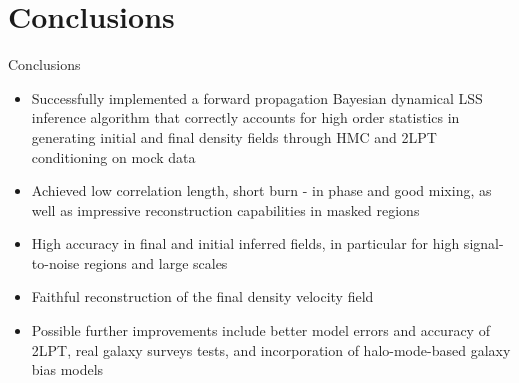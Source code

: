 \documentclass[10pt]{beamer}
\begin{document}
\section[Conclusions]{Conclusions}
\begin{frame}[fragile]{Conclusions}
\begin{itemize}
    \item Successfully implemented a forward propagation Bayesian dynamical LSS inference algorithm that correctly accounts for high order statistics in generating initial and final density fields through HMC and 2LPT conditioning on mock data\pause
    \item Achieved low correlation length, short burn - in phase and good mixing, as well as impressive reconstruction capabilities in masked regions\pause
    \item High accuracy in final and initial inferred fields, in particular for high signal-to-noise regions and large scales\pause
    \item Faithful reconstruction of the final density velocity field\pause
    \item Possible further improvements include better model errors and accuracy of 2LPT, real galaxy surveys tests, and incorporation of halo-mode-based galaxy bias models
\end{itemize}
  
\end{frame}
\section[Thank you for your attention]{}
\end{document}
